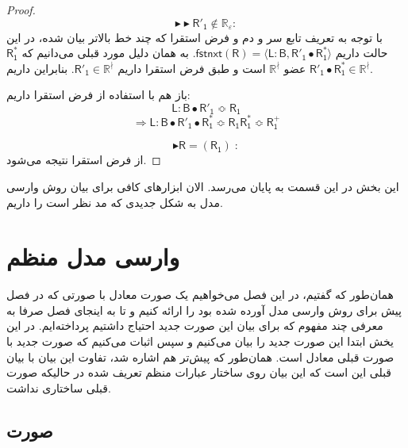 \begin{proof}
	$$\blacktriangleright\blacktriangleright\mathsf{R'_1} \notin \mathbb{R_\varepsilon}:$$
با توجه به تعریف تابع سر و دم و فرض استقرا که چند خط بالاتر بیان شده، در این حالت داریم 
	$\mathsf{fstnxt(R)=\langle L:B , R'_1 \bullet R_1^* \rangle}$.
	به همان دلیل مورد قبلی می‌دانیم که $\mathsf{R_1^*}$ عضو $\mathbb{R^\nmid}$ است و طبق فرض استقرا داریم $\mathsf{R'_1} \in \mathbb{R^\nmid}$. بنابراین داریم
		$\mathsf{R'_1 \bullet R_1^*} \in \mathbb{R^\nmid}$.
		
		باز هم با استفاده از فرض استقرا داریم:
		$$\mathsf{L:B \bullet R'_1 \Bumpeq R_1}$$
		$$\Rightarrow \mathsf{L:B \bullet R'_1 \bullet R_1^* \Bumpeq R_1 R_1^* \Bumpeq R_1^+}$$
	
	$$\blacktriangleright\mathsf{R=(R_1)\;:}$$
	از فرض استقرا نتیجه می‌شود.
\end{proof}

این بخش در این قسمت به پایان می‌رسد. الان ابزارهای کافی برای بیان روش وارسی مدل به شکل جدیدی که مد نظر است را داریم.

\section{وارسی مدل منظم}
همان‌طور که گفتیم، در این فصل می‌خواهیم یک صورت معادل با صورتی که در فصل پیش برای روش وارسی مدل آورده شده بود را ارائه کنیم و تا به اینجای فصل صرفا به معرفی چند مفهوم که برای بیان این صورت جدید احتیاج داشتیم پرداخته‌ایم. در این یخش ابتدا این صورت جدید را بیان می‌‌کنیم و سپس اثبات می‌‌کنیم که صورت جدید با صورت قبلی معادل است. همان‌طور که پیش‌تر هم اشاره شد، تفاوت این بیان با بیان قبلی این است که این بیان روی ساختار عبارات منظم تعریف شده در حالیکه صورت قبلی ساختاری نداشت.
\subsection{صورت}


